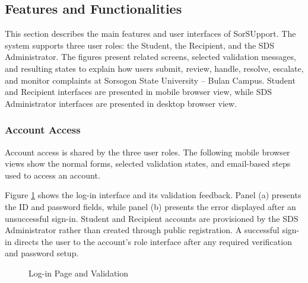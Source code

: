 \subsection{Features and Functionalities}
\label{sec:features}

This section describes the main features and user interfaces of SorSUpport. The system supports three user roles: the Student, the Recipient, and the SDS Administrator. The figures present related screens, selected validation messages, and resulting states to explain how users submit, review, handle, resolve, escalate, and monitor complaints at Sorsogon State University -- Bulan Campus. Student and Recipient interfaces are presented in mobile browser view, while SDS Administrator interfaces are presented in desktop browser view.

\FloatBarrier
\subsubsection{Account Access}

Account access is shared by the three user roles. The following mobile browser views show the normal forms, selected validation states, and email-based steps used to access an account.

Figure \ref{fig:login} shows the log-in interface and its validation feedback. Panel (a) presents the ID and password fields, while panel (b) presents the error displayed after an unsuccessful sign-in. Student and Recipient accounts are provisioned by the SDS Administrator rather than created through public registration. A successful sign-in directs the user to the account's role interface after any required verification and password setup.

\renewcommand{\thefigure}{5.1}
\begin{figure}[htbp]
    \centering
    \begin{minipage}[t]{0.43\linewidth}
        \centering
        \vspace{0pt}
        \par{}\par
    \end{minipage}\hspace{0.04\linewidth}
    \begin{minipage}[t]{0.43\linewidth}
        \centering
        \vspace{0pt}
        \par{}\par
    \end{minipage}
    \caption{Log-in Page and Validation}
    \label{fig:login}
\end{figure}
\FloatBarrier

